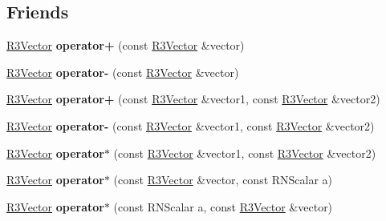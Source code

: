 \subsection*{Friends}
\begin{DoxyCompactItemize}
\item 
\hyperlink{class_r3_vector}{R3\+Vector} {\bfseries operator+} (const \hyperlink{class_r3_vector}{R3\+Vector} \&vector)\hypertarget{class_r3_vector_a226d6a64a433073a0176b9ee79aad1b2}{}\label{class_r3_vector_a226d6a64a433073a0176b9ee79aad1b2}

\item 
\hyperlink{class_r3_vector}{R3\+Vector} {\bfseries operator-\/} (const \hyperlink{class_r3_vector}{R3\+Vector} \&vector)\hypertarget{class_r3_vector_af52bab78e1363027a93383e1d349f909}{}\label{class_r3_vector_af52bab78e1363027a93383e1d349f909}

\item 
\hyperlink{class_r3_vector}{R3\+Vector} {\bfseries operator+} (const \hyperlink{class_r3_vector}{R3\+Vector} \&vector1, const \hyperlink{class_r3_vector}{R3\+Vector} \&vector2)\hypertarget{class_r3_vector_a85e2cea04e0dbb82f27651a7a5bcb343}{}\label{class_r3_vector_a85e2cea04e0dbb82f27651a7a5bcb343}

\item 
\hyperlink{class_r3_vector}{R3\+Vector} {\bfseries operator-\/} (const \hyperlink{class_r3_vector}{R3\+Vector} \&vector1, const \hyperlink{class_r3_vector}{R3\+Vector} \&vector2)\hypertarget{class_r3_vector_a365da703dfbe4e8adc8335813d743bf6}{}\label{class_r3_vector_a365da703dfbe4e8adc8335813d743bf6}

\item 
\hyperlink{class_r3_vector}{R3\+Vector} {\bfseries operator$\ast$} (const \hyperlink{class_r3_vector}{R3\+Vector} \&vector1, const \hyperlink{class_r3_vector}{R3\+Vector} \&vector2)\hypertarget{class_r3_vector_a22517bf91c64593ad01135e427a6e2fd}{}\label{class_r3_vector_a22517bf91c64593ad01135e427a6e2fd}

\item 
\hyperlink{class_r3_vector}{R3\+Vector} {\bfseries operator$\ast$} (const \hyperlink{class_r3_vector}{R3\+Vector} \&vector, const R\+N\+Scalar a)\hypertarget{class_r3_vector_a3a84ec353833ccf3f520642c86125f5a}{}\label{class_r3_vector_a3a84ec353833ccf3f520642c86125f5a}

\item 
\hyperlink{class_r3_vector}{R3\+Vector} {\bfseries operator$\ast$} (const R\+N\+Scalar a, const \hyperlink{class_r3_vector}{R3\+Vector} \&vector)\hypertarget{class_r3_vector_ae917e4071c2c955b89a629f342dd1111}{}\label{class_r3_vector_ae917e4071c2c955b89a629f342dd1111}


\end{DoxyCompactItemize}
